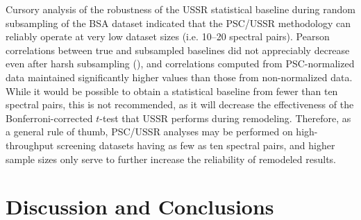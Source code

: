 \begin{doublespace}
Cursory analysis of the robustness of the USSR statistical
baseline during random subsampling of the BSA dataset indicated that the
PSC/USSR methodology can reliably operate at very low dataset sizes
(i.e. 10--20 spectral pairs). Pearson correlations between true and subsampled
baselines did not appreciably decrease even after harsh subsampling
(), and correlations computed from PSC-normalized
data maintained significantly higher values than those from non-normalized
data. While it would be possible to obtain a statistical baseline from fewer
than ten spectral pairs, this is not recommended, as it will decrease the
effectiveness of the Bonferroni-corrected $t$-test that USSR performs during
remodeling. Therefore, as a general rule of thumb, PSC/USSR analyses may be
performed on high-throughput screening datasets having as few as ten spectral
pairs, and higher sample sizes only serve to further increase the reliability
of remodeled results.
\end{doublespace}

\section{Discussion and Conclusions}

